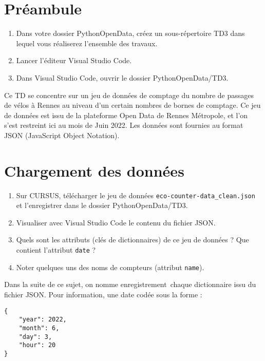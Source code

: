 \documentclass[11pt,a4paper]{article}
\begin{document}

\section*{Préambule}
\begin{enumerate}
    \item Dans votre dossier PythonOpenData, créez un sous-répertoire TD3 dans lequel vous réaliserez l'ensemble des travaux.
    \item Lancer l'éditeur Visual Studio Code.
    \item Dans Visual Studio Code, ouvrir le dossier PythonOpenData/TD3. 
\end{enumerate}

Ce TD se concentre sur un jeu de données de comptage du nombre de passages de vélos à Rennes au niveau d'un certain nombres de bornes de comptage. 
Ce jeu de données est issu de la plateforme Open Data de Rennes Métropole, et l'on s'est restreint ici au mois de Juin 2022. Les données sont fournies au format JSON (JavaScript Object Notation).

\section{Chargement des données}

\begin{enumerate}
    \item Sur CURSUS, télécharger le jeu de données \verb+eco-counter-data_clean.json+ et l'enregistrer dans le dossier PythonOpenData/TD3.
    \item Visualiser avec Visual Studio Code le contenu du fichier JSON.
    \item Quels sont les attributs (clés de dictionnaires) de ce jeu de données ? Que contient l'attribut \verb+date+ ?
    \item Noter quelques uns des noms de compteurs (attribut \verb+name+).
\end{enumerate}

Dans la suite de ce sujet, on nomme \og enregistrement\fg ~chaque dictionnaire issu du fichier JSON.
Pour information, une date codée sous la forme :
\begin{verbatim}
{
    "year": 2022,
    "month": 6,
    "day": 3,
    "hour": 20
}
\end{verbatim}
\end{document}
